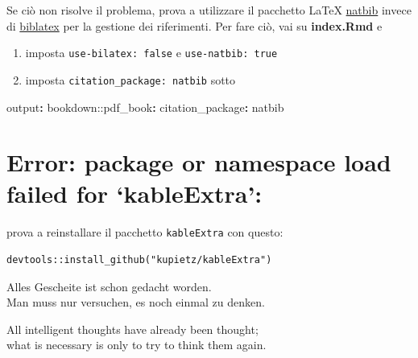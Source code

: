 \documentclass[a4paper, 11pt, nobind]{templates/ociamthesis}
\providecommand{\tightlist}{%
  \setlength{\itemsep}{0pt}\setlength{\parskip}{0pt}}
\newenvironment{Shaded}{\begin{snugshade}}{\end{snugshade}}
\newcommand{\AttributeTok}[1]{\textcolor[rgb]{0.77,0.63,0.00}{#1}}
\newcommand{\FunctionTok}[1]{\textcolor[rgb]{0.00,0.00,0.00}{#1}}
\newcommand{\KeywordTok}[1]{\textcolor[rgb]{0.13,0.29,0.53}{\textbf{#1}}}
\renewenvironment{Shaded}
{
  \vspace{10pt}%
  \begin{snugshade}%
}{%
  \end{snugshade}%
  \vspace{8pt}%
}
\begin{document}
Se ciò non risolve il problema, prova a utilizzare il pacchetto LaTeX \href{https://www.overleaf.com/learn/latex/Bibliography_management_with_natbib}{natbib} invece di \href{https://www.overleaf.com/learn\%20/latex/Articles/Getting_started_with_BibLaTeX}{biblatex} per la gestione dei riferimenti.
Per fare ciò, vai su \textbf{index.Rmd} e

\begin{enumerate}
\def\labelenumi{\arabic{enumi}.}
\tightlist
\item
  imposta \texttt{use-bilatex:\ false} e \hspace{0pt}\hspace{0pt}\texttt{use-natbib:\ true}
\item
  imposta \texttt{citation\_package:\ natbib} sotto
\end{enumerate}

\begin{Shaded}
\begin{Highlighting}[]
\FunctionTok{output}\KeywordTok{:}
\AttributeTok{  bookdown:}\FunctionTok{:pdf\_book}\KeywordTok{:}
\AttributeTok{    }\FunctionTok{citation\_package}\KeywordTok{:}\AttributeTok{ natbib}
\end{Highlighting}
\end{Shaded}

\hypertarget{error-package-or-namespace-load-failed-for-kableextra}{%
\section{Error: package or namespace load failed for `kableExtra':}\label{error-package-or-namespace-load-failed-for-kableextra}}

prova a reinstallare il pacchetto \texttt{kableExtra} con questo:

\begin{verbatim}
devtools::install_github("kupietz/kableExtra")
\end{verbatim}

\begin{savequote}
Alles Gescheite ist schon gedacht worden.\\
Man muss nur versuchen, es noch einmal zu denken.

All intelligent thoughts have already been thought;\\
what is necessary is only to try to think them again.
\end{savequote}
\end{document}
